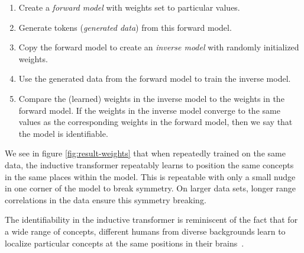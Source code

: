 \documentclass{article}
\begin{document}
\begin{enumerate}
    \itemsep -0.25em 
    \item Create a \emph{forward model} with weights set to particular values.
    \item Generate tokens (\emph{generated data}) from this forward model.
    \item Copy the forward model to create an \emph{inverse model} with randomly initialized weights.
    \item Use the generated data from the forward model to train the inverse model.
    \item Compare the (learned) weights in the inverse model to the weights in the forward model.  If the weights in the inverse model converge to the same values as the corresponding weights in the forward model, then we say that the model is identifiable.
\end{enumerate}

We see in figure \ref{fig:result-weights} that when repeatedly trained on the same data, the inductive transformer repeatably learns to position the same concepts in the same places within the model. This is repeatable with only a small nudge in one corner of the model to break symmetry. On larger data sets, longer range correlations in the data ensure this symmetry breaking.

The identifiability in the inductive transformer is reminiscent of the fact that for a wide range of concepts, different humans from diverse backgrounds learn to localize particular concepts at the same positions in their brains~\citep{DBLP:journals/nature/HuthHGTG16, li2023large, geva-etal-2021-transformer, merlin2022language}.

\end{document}
